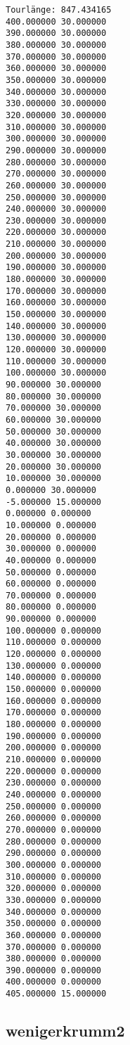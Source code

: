 \documentclass[a4paper, 10pt, ngerman]{article}
\begin{document}
\begin{verbatim}
Tourlänge: 847.434165
400.000000 30.000000
390.000000 30.000000
380.000000 30.000000
370.000000 30.000000
360.000000 30.000000
350.000000 30.000000
340.000000 30.000000
330.000000 30.000000
320.000000 30.000000
310.000000 30.000000
300.000000 30.000000
290.000000 30.000000
280.000000 30.000000
270.000000 30.000000
260.000000 30.000000
250.000000 30.000000
240.000000 30.000000
230.000000 30.000000
220.000000 30.000000
210.000000 30.000000
200.000000 30.000000
190.000000 30.000000
180.000000 30.000000
170.000000 30.000000
160.000000 30.000000
150.000000 30.000000
140.000000 30.000000
130.000000 30.000000
120.000000 30.000000
110.000000 30.000000
100.000000 30.000000
90.000000 30.000000
80.000000 30.000000
70.000000 30.000000
60.000000 30.000000
50.000000 30.000000
40.000000 30.000000
30.000000 30.000000
20.000000 30.000000
10.000000 30.000000
0.000000 30.000000
-5.000000 15.000000
0.000000 0.000000
10.000000 0.000000
20.000000 0.000000
30.000000 0.000000
40.000000 0.000000
50.000000 0.000000
60.000000 0.000000
70.000000 0.000000
80.000000 0.000000
90.000000 0.000000
100.000000 0.000000
110.000000 0.000000
120.000000 0.000000
130.000000 0.000000
140.000000 0.000000
150.000000 0.000000
160.000000 0.000000
170.000000 0.000000
180.000000 0.000000
190.000000 0.000000
200.000000 0.000000
210.000000 0.000000
220.000000 0.000000
230.000000 0.000000
240.000000 0.000000
250.000000 0.000000
260.000000 0.000000
270.000000 0.000000
280.000000 0.000000
290.000000 0.000000
300.000000 0.000000
310.000000 0.000000
320.000000 0.000000
330.000000 0.000000
340.000000 0.000000
350.000000 0.000000
360.000000 0.000000
370.000000 0.000000
380.000000 0.000000
390.000000 0.000000
400.000000 0.000000
405.000000 15.000000
\end{verbatim}

\subsection*{wenigerkrumm2}
\end{document}
